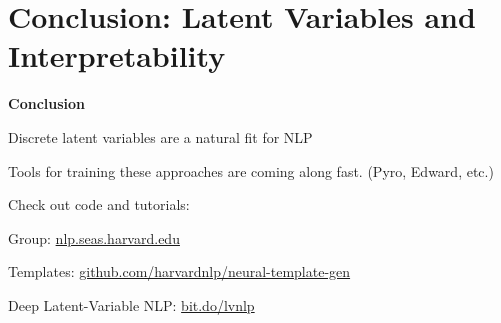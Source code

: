 \documentclass[aspectratio=169,12pt]{beamer}
\let\tempone\itemize
\let\temptwo\enditemize
\renewenvironment{itemize}{\tempone\addtolength{\itemsep}{0.5\baselineskip}}{\temptwo}
\newcommand{\thetitle}[1]{{\begin{center}\textbf{{#1}}\end{center}}}
\newcommand{\air}{\vspace{0.25cm}}
\begin{document}
\section{Conclusion: Latent Variables and Interpretability}

\begin{frame}
  \thetitle{Conclusion}
  \begin{itemize}
  \item Discrete latent variables are a natural fit for NLP

  \item Tools for training these approaches are coming along fast. (Pyro, Edward, etc.)
    \air

  \item Check out code and tutorials:
    \begin{itemize}
    \item Group: \url{nlp.seas.harvard.edu}
    \item Templates: \url{github.com/harvardnlp/neural-template-gen}
    \item Deep Latent-Variable NLP: \url{bit.do/lvnlp}
    \end{itemize}



  \end{itemize}
\end{frame}
\end{document}
